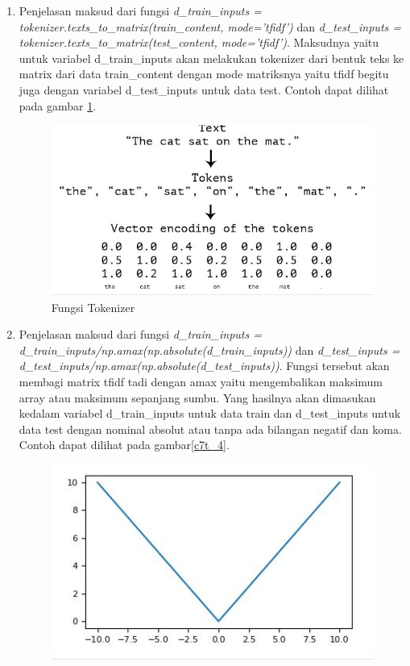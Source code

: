 \begin{enumerate}
\item Penjelasan maksud dari fungsi \emph{d\_train\_inputs = tokenizer.texts\_to\_matrix(train\_content, mode='tfidf')} dan \emph{d\_test\_inputs = tokenizer.texts\_to\_matrix(test\_content, mode='tfidf')}.
\subitem Maksudnya yaitu untuk variabel d\_train\_inputs akan melakukan tokenizer dari bentuk teks ke matrix dari data train\_content dengan mode matriksnya yaitu tfidf begitu juga dengan variabel d\_test\_inputs untuk data test. Contoh dapat dilihat pada gambar \ref{c7t_3}.
\begin{figure}[!htbp]
\centerline{\includegraphics[width=1\textwidth]{figures/c7t/3.JPG}}
\caption{Fungsi Tokenizer}
\label{c7t_3}
\end{figure}
\item Penjelasan maksud dari fungsi \emph{d\_train\_inputs = d\_train\_inputs/np.amax(np.absolute(d\_train\_inputs))} dan \emph{d\_test\_inputs = d\_test\_inputs/np.amax(np.absolute(d\_test\_inputs))}.
\subitem Fungsi tersebut akan membagi matrix tfidf tadi dengan amax yaitu mengembalikan maksimum array atau maksimum sepanjang sumbu. Yang hasilnya akan dimasukan kedalam variabel d\_train\_inputs untuk data train dan d\_test\_inputs untuk data test dengan nominal absolut atau tanpa ada bilangan negatif dan koma. Contoh dapat dilihat pada gambar\ref{c7t_4}.
\begin{figure}[!htbp]
\centerline{\includegraphics[width=1\textwidth]{figures/c7t/4.JPG}}

\end{figure}
\end{enumerate}
